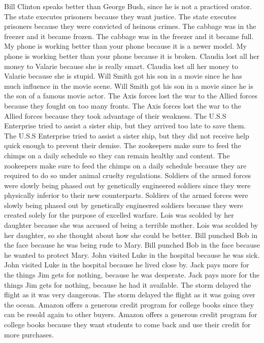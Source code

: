 \documentclass{article}
\begin{document}
\begin{enumerate}
Bill Clinton speaks better than George Bush, since he is not a practiced orator.
The state executes prisoners because they want justice.
The state executes prisoners because they were convicted of heinous crimes.
The cabbage was in the freezer and it became frozen.
The cabbage was in the freezer and it became full.
My phone is working better than your phone because it is a newer model.
My phone is working better than your phone because it is broken.
Claudia lost all her money to Valarie because she is really smart.
Claudia lost all her money to Valarie because she is stupid.
Will Smith got his son in a movie since he has much influence in the movie scene.
Will Smith got his son in a movie since he is the son of a famous movie actor.
The Axis forces lost the war to the Allied forces because they fought on too many fronts.
The Axis forces lost the war to the Allied forces because they took advantage of their weakness.
The U.S.S Enterprise tried to assist a sister ship, but they arrived too late to save them.
The U.S.S Enterprise tried to assist a sister ship, but they did not receive help quick enough to prevent their demise.
The zookeepers make sure to feed the chimps on a daily schedule so they can remain healthy and content.
The zookeepers make sure to feed the chimps on a daily schedule because they are required to do so under animal cruelty regulations.
Soldiers of the armed forces were slowly being phased out by genetically engineered soldiers since they were physically inferior to their new counterparts.
Soldiers of the armed forces were slowly being phased out by genetically engineered soldiers because they were created solely for the purpose of excelled warfare.
Lois was scolded by her daughter because she was accused of being a terrible mother.
Lois was scolded by her daughter, so she thought about how she could be better.
Bill punched Bob in the face because he was being rude to Mary.
Bill punched Bob in the face because he wanted to protect Mary.
John visited Luke in the hospital because he was sick.
John visited Luke in the hospital because he lived close by.
Jack pays more for the things Jim gets for nothing, because he was desperate.
Jack pays more for the things Jim gets for nothing, because he had it available.
The storm delayed the flight as it was very dangerous.
The storm delayed the flight as it was going over the ocean.
Amazon offers a generous credit program for college books since they can be resold again to other buyers.
Amazon offers a generous credit program for college books because they want students to come back and use their credit for more purchases.

\end{enumerate}
\end{document}

